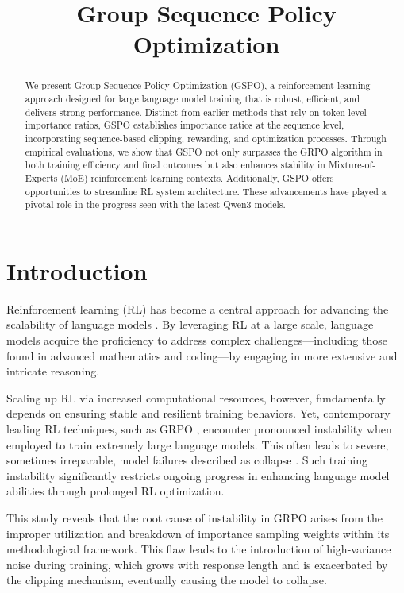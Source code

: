 \title{Group Sequence Policy Optimization}

\begin{abstract}
We present Group Sequence Policy Optimization (GSPO), a reinforcement learning approach designed for large language model training that is robust, efficient, and delivers strong performance. Distinct from earlier methods that rely on token-level importance ratios, GSPO establishes importance ratios at the sequence level, incorporating sequence-based clipping, rewarding, and optimization processes. Through empirical evaluations, we show that GSPO not only surpasses the GRPO algorithm in both training efficiency and final outcomes but also enhances stability in Mixture-of-Experts (MoE) reinforcement learning contexts. Additionally, GSPO offers opportunities to streamline RL system architecture. These advancements have played a pivotal role in the progress seen with the latest Qwen3 models.
\end{abstract}

\section{Introduction}
\label{sec:intro}

Reinforcement learning (RL) has become a central approach for advancing the scalability of language models \citep{o1,dpsk-r1,qwq32b,qwen3}. By leveraging RL at a large scale, language models acquire the proficiency to address complex challenges—including those found in advanced mathematics and coding—by engaging in more extensive and intricate reasoning.

Scaling up RL via increased computational resources, however, fundamentally depends on ensuring stable and resilient training behaviors. Yet, contemporary leading RL techniques, such as GRPO \citep{grpo}, encounter pronounced instability when employed to train extremely large language models. This often leads to severe, sometimes irreparable, model failures described as collapse \citep{qwen3, minimax-m1}. Such training instability significantly restricts ongoing progress in enhancing language model abilities through prolonged RL optimization.

This study reveals that the root cause of instability in GRPO arises from the improper utilization and breakdown of importance sampling weights within its methodological framework. This flaw leads to the introduction of high-variance noise during training, which grows with response length and is exacerbated by the clipping mechanism, eventually causing the model to collapse.

